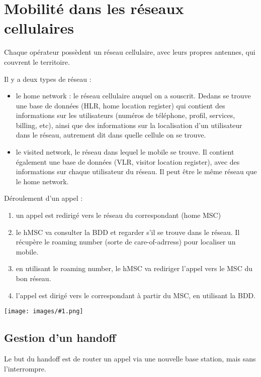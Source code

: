 \documentclass[10pt,a4paper]{report}
\newcommand{\dessin}[1]{\begin{center}\texttt{[image: images/\#1.png]}\end{center}}
\begin{document}
  	
  	
	\section{Mobilité dans les réseaux cellulaires}
	
	
	
	Chaque opérateur possèdent un réseau cellulaire, avec leurs propres antennes, qui couvrent le territoire.
	
	Il y a deux types de réseau :
	
	\begin{itemize}
		\item le home network : le réseau cellulaire auquel on a souscrit. Dedans se trouve une base de données (HLR, home location register) qui contient des informations sur les utilisateurs (numéros de téléphone, profil, services, billing, etc), ainsi que des informations sur la localisation d'un utilisateur dans le réseau, autrement dit dans quelle cellule on se trouve.
		
		\item le visited network, le réseau dans lequel le mobile se trouve. Il contient également une base de données (VLR, visitor location register), avec des informations sur chaque utilisateur du réseau. Il peut être le même réseau que le home network.
	\end{itemize}

	Déroulement d'un appel :
	
	\begin{enumerate}
		\item un appel est redirigé vers le réseau du correspondant (home MSC)
		\item le hMSC va consulter la BDD et regarder s'il se trouve dans le réseau. Il récupère le roaming number (sorte de care-of-adrress) pour localiser un mobile.
		\item en utilisant le roaming number, le hMSC va rediriger l'appel vers le MSC du bon réseau.
		\item l'appel est dirigé vers le correspondant à partir du MSC, en utilisant la BDD.
	\end{enumerate}
	
	\dessin{59}
	
	\subsection{Gestion d'un handoff}
	
	Le but du handoff est de router un appel via une nouvelle base station, mais sans l'interrompre.
		
\end{document}
